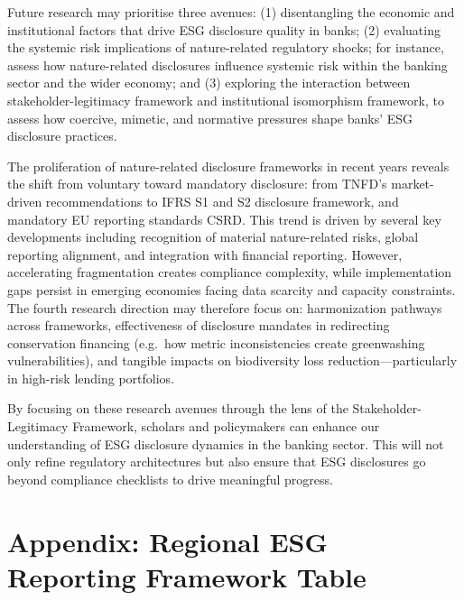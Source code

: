\documentclass[
  authoryear]{elsarticle}
\begin{document}
Future research may prioritise three avenues: (1) disentangling the
economic and institutional factors that drive ESG disclosure quality in
banks; (2) evaluating the systemic risk implications of nature-related
regulatory shocks; for instance, assess how nature-related disclosures
influence systemic risk within the banking sector and the wider economy;
and (3) exploring the interaction between stakeholder-legitimacy
framework and institutional isomorphism framework, to assess how
coercive, mimetic, and normative pressures shape banks' ESG disclosure
practices.

The proliferation of nature-related disclosure frameworks in recent
years reveals the shift from voluntary toward mandatory disclosure: from
TNFD's market-driven recommendations to IFRS S1 and S2 disclosure
framework, and mandatory EU reporting standards CSRD. This trend is
driven by several key developments including recognition of material
nature-related risks, global reporting alignment, and integration with
financial reporting. However, accelerating fragmentation creates
compliance complexity, while implementation gaps persist in emerging
economies facing data scarcity and capacity constraints. The fourth
research direction may therefore focus on: harmonization pathways across
frameworks, effectiveness of disclosure mandates in redirecting
conservation financing (e.g.~how metric inconsistencies create
greenwashing vulnerabilities), and tangible impacts on biodiversity loss
reduction---particularly in high-risk lending portfolios.\hspace{0pt}

By focusing on these research avenues through the lens of the
Stakeholder-Legitimacy Framework, scholars and policymakers can enhance
our understanding of ESG disclosure dynamics in the banking sector. This
will not only refine regulatory architectures but also ensure that ESG
disclosures go beyond compliance checklists to drive meaningful
progress.

\section{Appendix: Regional ESG Reporting Framework
Table}\label{appendix-regional-esg-reporting-framework-table}

\newpage
\end{document}
